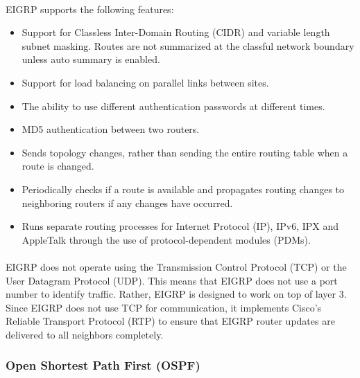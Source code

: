 \paragraph{}EIGRP supports the following features:
\begin{itemize}
\item Support for Classless Inter-Domain Routing (CIDR) and variable length subnet masking. Routes are not summarized at the classful network boundary unless auto summary is enabled.
\item Support for load balancing on parallel links between sites.
\item The ability to use different authentication passwords at different times.
\item MD5 authentication between two routers.
\item Sends topology changes, rather than sending the entire routing table when a route is changed.
\item Periodically checks if a route is available and propagates routing changes to neighboring routers if any changes have occurred.
\item Runs separate routing processes for Internet Protocol (IP), IPv6, IPX and AppleTalk through the use of protocol-dependent modules (PDMs).
\end{itemize}
\paragraph{}EIGRP does not operate using the Transmission Control Protocol (TCP) or the User Datagram Protocol (UDP). This means that EIGRP does not use a port number to identify traffic. Rather, EIGRP is designed to work on top of layer 3. Since EIGRP does not use TCP for communication, it implements Cisco's Reliable Transport Protocol (RTP) to ensure that EIGRP router updates are delivered to all neighbors completely.

\subsubsection*{Open Shortest Path First (OSPF)\cite{OSPFv2}\cite{OSPFIPv6}}
